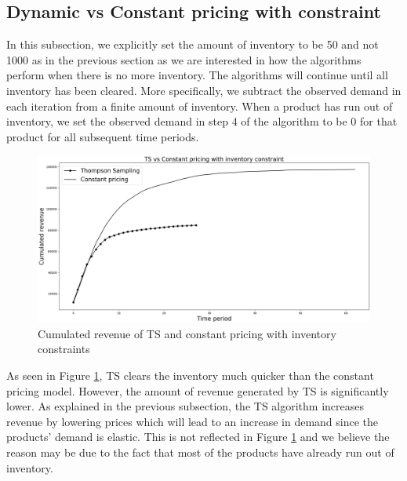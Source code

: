 \documentclass[a4paper]{article}
\begin{document}
\subsection{Dynamic vs Constant pricing with constraint}
In this subsection, we explicitly set the amount of inventory to be 50 and not 1000 as in the previous section as we are interested in how the algorithms perform when there is no more inventory. The algorithms will continue until all inventory has been cleared. More specifically, we subtract the observed demand in each iteration from a finite amount of inventory. When a product has run out of inventory, we set the observed demand in step 4 of the algorithm to be 0 for that product for all subsequent time periods.
\begin{figure}[h]
	\centering
	\includegraphics[width=1\textwidth]{Figure_2-2.png}
	\caption{\label{fig:five}Cumulated revenue of TS and constant pricing with inventory constraints}
\end{figure}
\newline
\newline
As seen in Figure \ref{fig:five}, TS clears the inventory much quicker than the constant pricing model. However, the amount of revenue generated by TS is significantly lower. As explained in the previous subsection, the TS algorithm increases revenue by lowering prices which will lead to an increase in demand since the products' demand is elastic. This is not reflected in Figure \ref{fig:five} and we believe the reason may be due to the fact that most of the products have already run out of inventory. 
\newline
\newline
\end{document}
